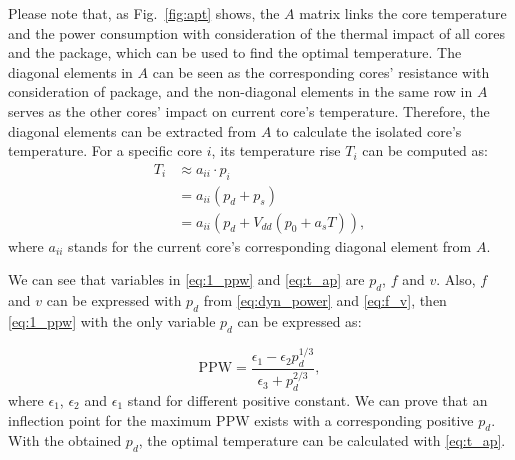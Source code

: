Please note that, as Fig.~\ref{fig:apt} shows, the $A$ matrix links the core temperature and the power consumption with consideration of the thermal impact of all cores and the package, which can be used to find the optimal temperature. The diagonal elements in $A$ can be seen as the corresponding cores' resistance with consideration of package, and the non-diagonal elements in the same row in $A$ serves as the other cores' impact on current core's temperature. Therefore, the diagonal elements can be extracted from $A$ to calculate the isolated core's temperature. For a specific core $i$, its temperature rise $T_{i}$ can be computed as:
\begin{equation}\label{eq:t_ap}
\begin{split}
T_{i}&\approx a_{ii} \cdot p_{i}\\
&=a_{ii}(p_{d}+p_{s})\\
&=a_{ii}(p_{d}+V_{dd} (p_{0}+a_{s}T)),
\end{split}
\end{equation}
where $a_{ii}$ stands for the current core's corresponding diagonal element from $A$.

We can see that variables in \eqref{eq:1_ppw} and \eqref{eq:t_ap} are $p_{d}$, $f$ and $v$. Also, $f$ and $v$ can be expressed with $p_{d}$ from \eqref{eq:dyn_power} and \eqref{eq:f_v}, then \eqref{eq:1_ppw} with the only variable $p_{d}$ can be expressed as:


\begin{equation}\label{eq:1_ppw_2}
\text{PPW} = \frac{\epsilon_{1}-\epsilon_{2}p_{d}^{1/3}}{\epsilon_{3}+p_{d}^{2/3}},
\end{equation}
where $\epsilon_{1}$, $\epsilon_{2}$ and $\epsilon_{1}$ stand for different positive constant. We can prove that an inflection point for the maximum $\text{PPW}$ exists with a corresponding positive $p_{d}$. With the obtained $p_{d}$, the optimal temperature can be calculated with \eqref{eq:t_ap}.

